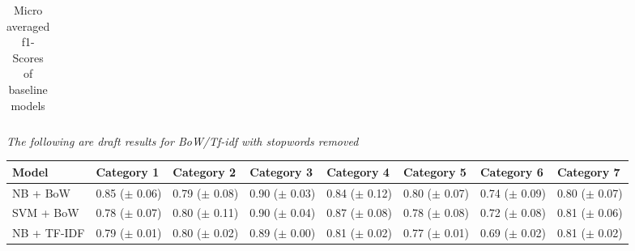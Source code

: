 \documentclass[a4paper,twoside,phd]{BYUPhys}
\begin{document}
\begin{table}[H]
\begin{tabular}{|p{1.7cm}|p{1.6cm}|p{1.6cm}|p{1.6cm}|p{1.6cm}|p{1.6cm}|p{1.6cm}|p{1.6cm}|}
	\end{tabular}
	\caption{Micro averaged f1-Scores of baseline models}
	\label{table:BaselineAccuracy}
\end{table}

\textit{The following are draft results for BoW/Tf-idf with stopwords removed}

\begin{table}[H]
	\centering
	\begin{tabular}{|p{1.7cm}|p{1.6cm}|p{1.6cm}|p{1.6cm}|p{1.6cm}|p{1.6cm}|p{1.6cm}|p{1.6cm}|}
		\hline
		Model & Category 1                                                                           & Category 2    & Category 3 & Category 4 & Category 5 & Category 6 & Category 7                                                                                                                                                                                                                                                                                                                                                          \\
		\hline
		NB + BoW  & 0.85 \newline ($\pm$ 0.06) &  0.79 \newline ($\pm$ 0.08)  & 0.90 \newline ($\pm$ 0.03)  &  0.84 \newline ($\pm$ 0.12)  &  0.80 \newline ($\pm$ 0.07)   &  0.74 \newline ($\pm$ 0.09)   &  0.80 \newline ($\pm$ 0.07)    \\
		\hline
		
		SVM + BoW  &  0.78 \newline ($\pm$ 0.07)  &  0.80 \newline ($\pm$ 0.11)  & 0.90 \newline ($\pm$ 0.04)  &  0.87 \newline ($\pm$ 0.08)  & 0.78 \newline ($\pm$ 0.08)   &  0.72 \newline ($\pm$ 0.08)   &  0.81 \newline ($\pm$ 0.06)  \\
		\hline                                                                                                                                                                                                                
				
		NB + TF-IDF  &  0.79 \newline ($\pm$ 0.01)  & 0.80 \newline ($\pm$ 0.02)  &  0.89 \newline ($\pm$ 0.00)  &  0.81 \newline ($\pm$ 0.02)  & 0.77 \newline ($\pm$ 0.01)   & 0.69 \newline ($\pm$ 0.02)   &  0.81 \newline ($\pm$ 0.02)   \\
		\hline
		

\end{tabular}
\end{table}
\end{document}
